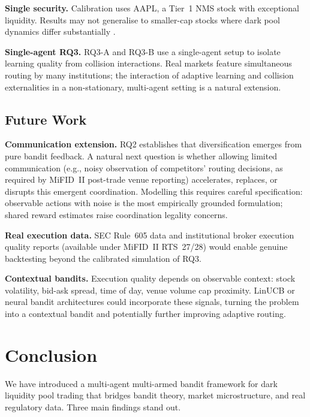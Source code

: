 \documentclass[11pt]{article}
\begin{document}
\textbf{Single security.} Calibration uses AAPL, a Tier~1 NMS stock with
exceptional liquidity. Results may not generalise to smaller-cap stocks
where dark pool dynamics differ substantially \citep{foley2016dark}.

\textbf{Single-agent RQ3.} RQ3-A and RQ3-B use a single-agent setup to
isolate learning quality from collision interactions. Real markets feature
simultaneous routing by many institutions; the interaction of adaptive
learning and collision externalities in a non-stationary, multi-agent
setting is a natural extension.

\subsection{Future Work}

\textbf{Communication extension.} RQ2 establishes that diversification
emerges from pure bandit feedback. A natural next question is whether
allowing limited communication (e.g., noisy observation of competitors'
routing decisions, as required by MiFID~II post-trade venue reporting)
accelerates, replaces, or disrupts this emergent coordination.
Modelling this requires careful specification: observable actions with
noise is the most empirically grounded formulation; shared reward estimates
raise coordination legality concerns.

\textbf{Real execution data.} SEC Rule~605 data and institutional broker
execution quality reports (available under MiFID~II RTS~27/28) would
enable genuine backtesting beyond the calibrated simulation of RQ3.

\textbf{Contextual bandits.} Execution quality depends on observable
context: stock volatility, bid-ask spread, time of day, venue volume cap
proximity.
LinUCB or neural bandit architectures could incorporate these signals,
turning the problem into a contextual bandit and potentially further
improving adaptive routing.

\section{Conclusion}
\label{sec:conclusion}

We have introduced a multi-agent multi-armed bandit framework for dark
liquidity pool trading that bridges bandit theory, market microstructure,
and real regulatory data.
Three main findings stand out.
\end{document}

